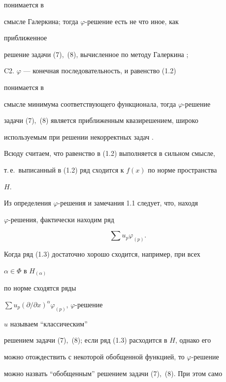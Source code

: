 понимается в 


смысле Галеркина; тогда $\varphi$-решение есть не что иное, как 


приближенное 


решение задачи (7),~(8), вычисленное по методу Галеркина \cite{8}; 


\medskip 


 


C2. $\varphi$ --- конечная последовательность, и равенство (1.2) 


понимается в 


смысле минимума соответствующего функционала, тогда $\varphi$-решение  


задачи (7),~(8) является приближенным квазирешением, широко 


используемым при решении некорректных задач \cite{8}. 


\medskip 


 


Всюду считаем, что равенство в (1.2) выполняется в сильном смысле, 


т.\,е.~выписанный в (1.2) ряд сходится к $f(x)$ по норме пространства 


$H$. 


 


Из определения $\varphi$-решения и замечания 1.1 следует, что, находя 


$\varphi$-решения, фактически находим ряд 


\begin{equation} 


\sum u_p\varphi_{(p)}. 


\end{equation} 


Когда ряд (1.3) достаточно хорошо сходится, например, при всех 


$\alpha\in\Phi$ в $H_{(\alpha)}$ 


по норме сходятся ряды 


$\sum u_p(\partial/\partial x)^\alpha\varphi_{(p)}$, $\varphi$-решение 


$u$ называем ``классическим'' 


решением задачи (7),~(8); если ряд (1.3) расходится в $H$, однако его 


можно отождествить с некоторой обобщенной функцией, то $\varphi$-решение 


можно назвать ``обобщенным'' решением задачи (7),~(8). При этом само 


